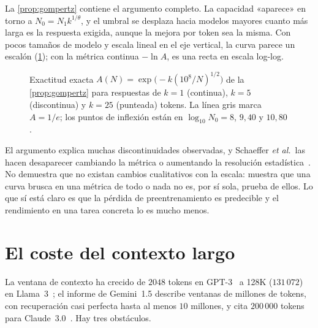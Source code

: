 La \cref{prop:gompertz} contiene el argumento completo. La capacidad «aparece» en torno a $N_0=N_1k^{1/\theta}$, y el umbral se desplaza hacia modelos mayores cuanto más larga es la respuesta exigida, aunque la mejora por token sea la misma. Con pocos tamaños de modelo y escala lineal en el eje vertical, la curva parece un escalón (\cref{fig:gompertz}); con la métrica continua $-\ln A$, es una recta en escala log-log.

\begin{figure}[h]
\centering
{}
\caption{Exactitud exacta $A(N)=\exp\bigl(-k(10^{8}/N)^{1/2}\bigr)$ de la \cref{prop:gompertz} para respuestas de $k=1$ (continua), $k=5$ (discontinua) y $k=25$ (punteada) tokens. La línea gris marca $A=1/e$; los puntos de inflexión están en $\log_{10}N_0=8$, $9{,}40$ y $10{,}80$.}
\label{fig:gompertz}
\end{figure}

\begin{observacion}
El argumento explica muchas discontinuidades observadas, y Schaeffer \emph{et al.}\ las hacen desaparecer cambiando la métrica o aumentando la resolución estadística~\cite{schaeffer}. No demuestra que no existan cambios cualitativos con la escala: muestra que una curva brusca en una métrica de todo o nada no es, por sí sola, prueba de ellos. Lo que sí está claro es que la pérdida de preentrenamiento es predecible y el rendimiento en una tarea concreta lo es mucho menos.
\end{observacion}

\section{El coste del contexto largo}

La ventana de contexto ha crecido de $2048$ tokens en GPT-3~\cite{brown} a 128K ($131\,072$) en Llama~3~\cite{llama3}; el informe de Gemini~1.5 describe ventanas de millones de tokens, con recuperación casi perfecta hasta al menos $10$ millones, y cita $200\,000$ tokens para Claude~3.0~\cite{gemini15}. Hay tres obstáculos.

